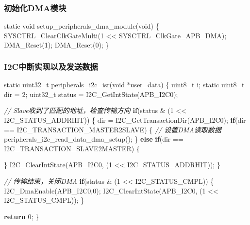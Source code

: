 \documentclass[
  12pt,
]{book}
\newenvironment{Shaded}{\begin{snugshade}}{\end{snugshade}}
\newcommand{\CommentTok}[1]{\textcolor[rgb]{0.56,0.35,0.01}{\textit{#1}}}
\newcommand{\ControlFlowTok}[1]{\textcolor[rgb]{0.13,0.29,0.53}{\textbf{#1}}}
\newcommand{\DataTypeTok}[1]{\textcolor[rgb]{0.13,0.29,0.53}{#1}}
\newcommand{\DecValTok}[1]{\textcolor[rgb]{0.00,0.00,0.81}{#1}}
\newcommand{\NormalTok}[1]{#1}
\begin{document}
\hypertarget{ux521dux59cbux5316dmaux6a21ux5757-3}{%
\subsubsection{初始化DMA模块}\label{ux521dux59cbux5316dmaux6a21ux5757-3}}

\begin{Shaded}
\begin{Highlighting}[]
\DataTypeTok{static} \DataTypeTok{void}\NormalTok{ setup_peripherals_dma_module(}\DataTypeTok{void}\NormalTok{)}
\NormalTok{\{}
\NormalTok{    SYSCTRL_ClearClkGateMulti(}\DecValTok{1}\NormalTok{ << SYSCTRL_ClkGate_APB_DMA);}
\NormalTok{    DMA_Reset(}\DecValTok{1}\NormalTok{);}
\NormalTok{    DMA_Reset(}\DecValTok{0}\NormalTok{);}
\NormalTok{\}}
\end{Highlighting}
\end{Shaded}

\hypertarget{i2cux4e2dux65adux5b9eux73b0ux4ee5ux53caux53d1ux9001ux6570ux636e-3}{%
\subsubsection{I2C中断实现以及发送数据}\label{i2cux4e2dux65adux5b9eux73b0ux4ee5ux53caux53d1ux9001ux6570ux636e-3}}

\begin{Shaded}
\begin{Highlighting}[]
\DataTypeTok{static} \DataTypeTok{uint32_t}\NormalTok{ peripherals_i2c_isr(}\DataTypeTok{void}\NormalTok{ *user_data)}
\NormalTok{\{}
  \DataTypeTok{uint8_t}\NormalTok{ i;}
  \DataTypeTok{static} \DataTypeTok{uint8_t}\NormalTok{ dir = }\DecValTok{2}\NormalTok{;}
  \DataTypeTok{uint32_t}\NormalTok{ status = I2C_GetIntState(APB_I2C0);}

  \CommentTok{// Slave收到了匹配的地址，检查传输方向}
  \ControlFlowTok{if}\NormalTok{(status & (}\DecValTok{1}\NormalTok{ << I2C_STATUS_ADDRHIT))}
\NormalTok{  \{}
\NormalTok{    dir = I2C_GetTransactionDir(APB_I2C0);}
    \ControlFlowTok{if}\NormalTok{(dir == I2C_TRANSACTION_MASTER2SLAVE)}
\NormalTok{    \{}
      \CommentTok{// 设置DMA读取数据}
\NormalTok{      peripherals_i2c_read_data_dma_setup();}
\NormalTok{    \}}
    \ControlFlowTok{else} \ControlFlowTok{if}\NormalTok{(dir == I2C_TRANSACTION_SLAVE2MASTER)}
\NormalTok{    \{}

\NormalTok{    \}}
\NormalTok{    I2C_ClearIntState(APB_I2C0, (}\DecValTok{1}\NormalTok{ << I2C_STATUS_ADDRHIT));}
\NormalTok{  \}}
  
  \CommentTok{// 传输结束，关闭DMA}
  \ControlFlowTok{if}\NormalTok{(status & (}\DecValTok{1}\NormalTok{ << I2C_STATUS_CMPL))}
\NormalTok{  \{}
\NormalTok{    I2C_DmaEnable(APB_I2C0,}\DecValTok{0}\NormalTok{);}
\NormalTok{    I2C_ClearIntState(APB_I2C0, (}\DecValTok{1}\NormalTok{ << I2C_STATUS_CMPL));}
\NormalTok{  \}}
  
  \ControlFlowTok{return} \DecValTok{0}\NormalTok{;}
\NormalTok{\}}
\end{Highlighting}
\end{Shaded}
\end{document}
